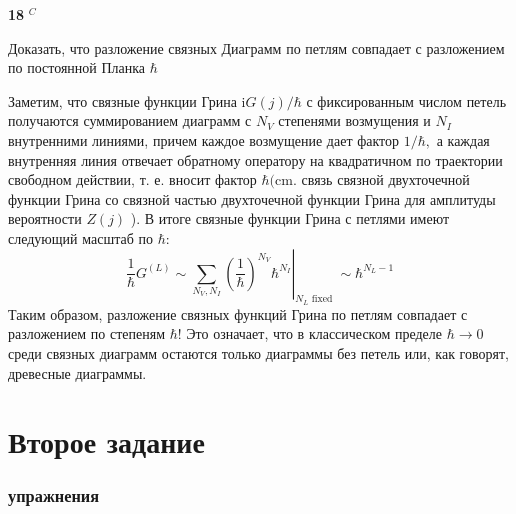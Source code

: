 \documentclass[a4paper,12pt]{article} %
\begin{document}
\begin{ttask}\textbf{18} $^{C}$ 
	
Доказать, что разложение связных Диаграмм по петлям совпадает с разложением по постоянной Планка $\hbar$



Заметим, что связные функции   Грина $ \mathrm{i} G(j) / \hbar  $ 
с   фиксированным числом петель получаются суммированием диаграмм с $N_{V}$ степенями возмущения и 
$N_{I}$ внутренними линиями, причем каждое возмущение дает фактор $1 / \hbar,$ 
а каждая внутренняя линия отвечает обратному оператору на квадратичном по траектории свободном действии, 
т. е. вносит фактор $\hbar(\mathrm{cm} .$ связь связной двухточечной функции Грина со связной частью двухточечной функции Грина 
для амплитуды вероятности $Z(j)$ ). 
В итоге связные функции Грина с петлями имеют следующий масштаб по $\hbar:$
$$
\left.\frac{1}{\hbar} G^{(L)} \sim \sum_{N_{V}, N_{I}}\left(\frac{1}{\hbar}\right)^{N_{V}} \hbar^{N_{I}}\right|_{N_{L} \text { fixed }} \sim \hbar^{N_{L}-1}
$$
Таким образом, разложение связных функций Грина по петлям совпадает с разложением по степеням $\hbar !$ 
Это означает, что в классическом пределе $\hbar \rightarrow 0$ среди связных диаграмм остаются только диаграммы без петель или, как говорят, древесные диаграммы.
































\end{ttask}













\clearpage
\part{Второе задание}


\section{упражнения}
\end{document}
